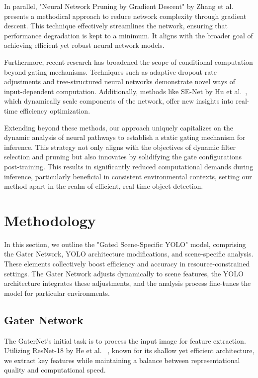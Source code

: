 \documentclass[runningheads]{llncs}
\begin{document}
In parallel, "Neural Network Pruning by Gradient Descent" by Zhang et al.~\cite{zhang2023neural} presents a methodical approach to reduce network complexity through gradient descent. This technique effectively streamlines the network, ensuring that performance degradation is kept to a minimum. It aligns with the broader goal of achieving efficient yet robust neural network models.

Furthermore, recent research has broadened the scope of conditional computation beyond gating mechanisms. Techniques such as adaptive dropout rate adjustments and tree-structured neural networks demonstrate novel ways of input-dependent computation. Additionally, methods like SE-Net by Hu et al.~\cite{hu2018squeeze}, which dynamically scale components of the network, offer new insights into real-time efficiency optimization.

Extending beyond these methods, our approach uniquely capitalizes on the dynamic analysis of neural pathways to establish a static gating mechanism for inference. This strategy not only aligns with the objectives of dynamic filter selection and pruning but also innovates by solidifying the gate configurations post-training. This results in significantly reduced computational demands during inference, particularly beneficial in consistent environmental contexts, setting our method apart in the realm of efficient, real-time object detection.
%
\section{Methodology}
In this section, we outline the "Gated Scene-Specific YOLO" model, comprising the Gater Network, YOLO architecture modifications, and scene-specific analysis. These elements collectively boost efficiency and accuracy in resource-constrained settings. The Gater Network adjusts dynamically to scene features, the YOLO architecture integrates these adjustments, and the analysis process fine-tunes the model for particular environments.

\subsection{Gater Network}
The GaterNet's initial task is to process the input image for feature extraction. Utilizing ResNet-18 by He et al. ~\cite{he2016deep}, known for its shallow yet efficient architecture, we extract key features while maintaining a balance between representational quality and computational speed.
\end{document}
